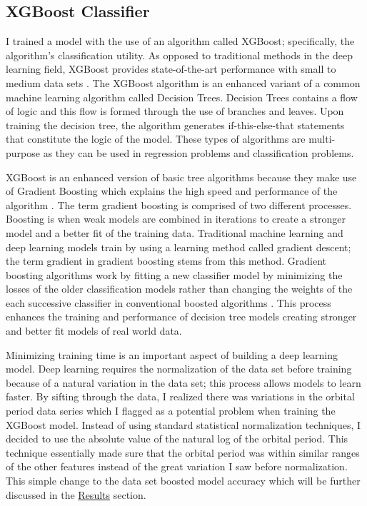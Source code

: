 \documentclass[12pt]{article}
\begin{document}
\subsection{XGBoost Classifier}
 I trained a model with the use of an algorithm called XGBoost; specifically, the algorithm's classification utility. As opposed to traditional methods in the deep learning field, XGBoost provides state-of-the-art performance with small to medium data sets \cite{xgboost}. The XGBoost algorithm is an enhanced variant of a common machine learning algorithm called Decision Trees. Decision Trees contains a flow of logic and this flow is formed through the use of branches and leaves. Upon training the decision tree, the algorithm generates if-this-else-that statements that constitute the logic of the model. These types of algorithms are multi-purpose as they can be used in regression problems and classification problems.
 \par
 XGBoost is an enhanced version of basic tree algorithms because they make use of Gradient Boosting \cite{xgboost, xgboostxplained} which explains the high speed and performance of the algorithm \cite{xgboostxplained}. The term gradient boosting is comprised of two different processes. Boosting is when weak models are combined in iterations to create a stronger model and a better fit of the training data. Traditional machine learning and deep learning models train by using a learning method called gradient descent; the term gradient in gradient boosting stems from this method. Gradient boosting algorithms work by fitting a new classifier model by minimizing the losses of the older classification models rather than changing the weights of the each successive classifier in conventional boosted algorithms \cite{xgboostxplained}. This process enhances the training and performance of decision tree models creating stronger and better fit models of real world data.
 \par
Minimizing training time is an important aspect of building a deep learning model. Deep learning requires the normalization of the data set before training because of a natural variation in the data set; this process allows models to learn faster. By sifting through the data, I realized there was variations in the orbital period data series which I flagged as a potential problem when training the XGBoost model. Instead of using standard statistical normalization techniques, I decided to use the absolute value of the natural log of the orbital period. This technique essentially made sure that the orbital period was within similar ranges of the other features instead of the great variation I saw before normalization. This simple change to the data set boosted model accuracy which will be further discussed in the \hyperref[sec:results]{Results} section.
\end{document}
